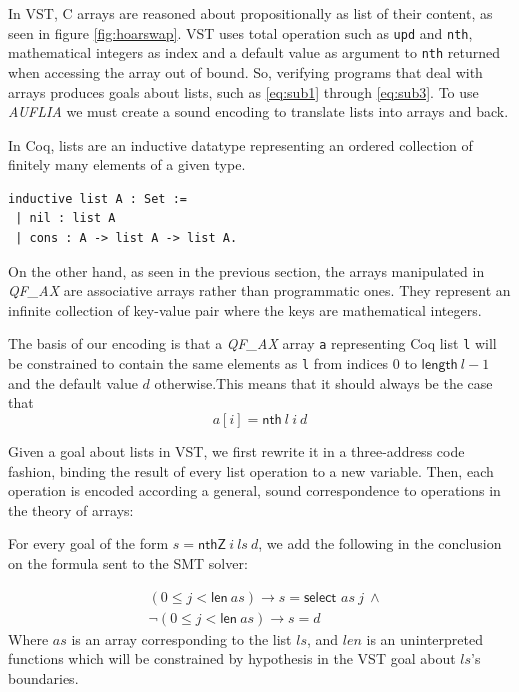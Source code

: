 \documentclass[onecolumn, preprint]{sigplanconf}
\begin{document}
In VST, C arrays are reasoned about propositionally as list of their content, as seen in figure \ref{fig:hoarswap}. VST uses total operation such as \texttt{upd} and \texttt{nth}, mathematical integers as index and a default value as argument to \texttt{nth} returned when accessing the array out of bound. So, verifying programs that deal with arrays produces goals about lists, such as \ref{eq:sub1} through \ref{eq:sub3}. To use \emph{AUFLIA} we must create a sound encoding to translate lists into arrays and back. 

In Coq, lists are an inductive datatype representing an ordered collection of finitely many elements of a given type.
\begin{center}
\begin{lstlisting}
inductive list A : Set :=
 | nil : list A
 | cons : A -> list A -> list A.
\end{lstlisting}
\end{center}
On the other hand, as seen in the previous section, the arrays manipulated in \emph{QF\_AX} are associative arrays rather than programmatic ones. They represent an infinite collection of key-value pair where the keys are mathematical integers. 

The basis of our encoding is that a \emph{QF\_AX} array \texttt{a} representing Coq list \texttt{l} will be constrained to contain the same elements as \texttt{l} from indices $0$ to $\mathsf{length}\ l - 1$ and the default value $d$ otherwise.This means that it should always be the case that
$$ a[i] = \textsf{nth}\ l\ i\ d$$

Given a goal about lists in VST, we first rewrite it in a three-address code fashion, binding the result of every list operation to a new variable. Then, each operation is encoded according a general, sound correspondence to operations in the theory of arrays:

For every goal of the form $s = \textsf{nthZ}\ i\ ls\ d$, we add the following in the conclusion on the formula sent to the SMT solver:

\begin{align*}
&(0 \leq j < \textsf{len}\ as) \to s = \textsf{select } as\ j\ \wedge \\
&\neg (0 \leq j < \textsf{len}\ as) \to s = d 
\end{align*}
Where $as$ is an array corresponding to the list $ls$, and $len$ is an uninterpreted functions which will be constrained by hypothesis in the VST goal about $ls$'s boundaries.
\end{document}
